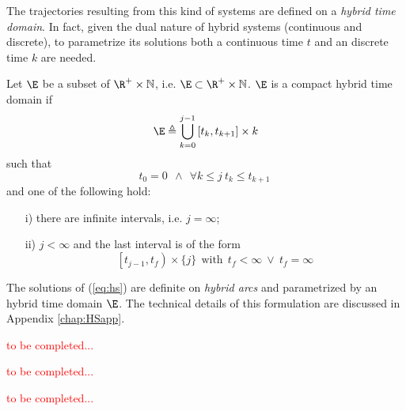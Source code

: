 %
The trajectories resulting from this kind of systems are defined on a \textit{hybrid time domain}. In fact, given the dual nature of hybrid systems (continuous and discrete), to parametrize its solutions both a continuous time $t$ and an discrete time $k$ are needed.
%
\begin{defn}
    Let $\E$ be a subset of $\R^+\times\mathbb{N}$, i.e. $\E\subset\R^+\times\mathbb{N}$. $\E$ is a compact hybrid time domain if 
    \begin{equation}
        \E\triangleq\bigcup_{k = 0}^{j-1}\left[t_k,t_{k+1}\right]\times {k} 
    \end{equation}
    such that
    \begin{equation}
        t_0 = 0~~\land~~\forall k\leq j~t_k\leq t_{k+1}~
    \end{equation}
    and one of the following hold:
    \begin{itemize}
        \item [i)] there are infinite intervals, i.e. $j = \infty$;
        \item [ii)] $j<\infty$ and the last interval is of the form
        \begin{equation}
            \left[t_{j-1},t_f\right)\times \{j\}~~\text{with}~~t_f<\infty~\lor~t_f = \infty
        \end{equation}
    \end{itemize}
\end{defn}
%
The solutions of (\ref{eq:hs}) are definite on \textit{hybrid arcs} and parametrized by an hybrid time domain $\E$. The technical details of this formulation are discussed in Appendix \ref{chap:HSapp}. 
%
\begin{exmp}
\textcolor{red}{to be completed...}
\end{exmp}
%
\begin{exmp} 
\textcolor{red}{to be completed...}
\end{exmp}
%
\begin{exmp}
\textcolor{red}{to be completed...}
\end{exmp}
%
